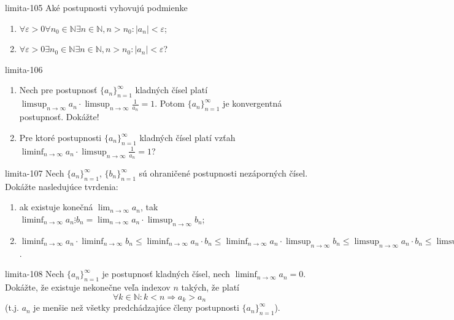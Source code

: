 \begin{defproblem}{limita-105}
Aké postupnosti vyhovujú podmienke
\begin{enumerate}
\item $\forall \varepsilon >0 \forall n_0 \in \mathbb{N} \exists n \in \mathbb{N},n>n_0: |a_n|< \varepsilon$;
\item $\forall \varepsilon >0 \exists n_0 \in \mathbb{N} \exists n \in \mathbb{N},n>n_0: |a_n|< \varepsilon$?
\end{enumerate}
\end{defproblem}

\begin{defproblem}{limita-106}
\begin{enumerate}
\item Nech pre postupnosť ${\{a_n\}}_{n=1}^\infty$ kladných čísel platí $\limsup_{n \rightarrow \infty} a_n \cdot \limsup_{n \rightarrow \infty} \frac{1}{a_n}=1$. Potom ${\{a_n\}}_{n=1}^\infty$ je konvergentná postupnosť. Dokážte!
\item Pre ktoré postupnosti ${\{a_n\}}_{n=1}^\infty$ kladných čísel platí vzťah $\liminf_{n \rightarrow \infty} a_n \cdot \limsup_{n \rightarrow \infty} \frac{1}{a_n}=1$?
\end{enumerate}
\end{defproblem}

\begin{defproblem}{limita-107}
Nech ${\{a_n\}}_{n=1}^\infty$, ${\{b_n\}}_{n=1}^\infty$ sú ohraničené postupnosti nezáporných čísel. Dokážte nasledujúce tvrdenia:
\begin{enumerate}
\item ak existuje konečná $\lim_{n \rightarrow \infty} a_n$, tak $\liminf_{n \rightarrow \infty} a_n \vdots b_n=\lim_{n \rightarrow \infty} a_n \cdot \limsup_{n \rightarrow \infty} b_n$;
\item $\liminf_{n \rightarrow \infty} a_n \cdot \liminf_{n \rightarrow \infty} b_n \leq \liminf_{n \rightarrow \infty} a_n \cdot b_n \leq \liminf_{n \rightarrow \infty} a_n \cdot \limsup_{n \rightarrow \infty} b_n \leq \limsup_{n \rightarrow \infty} a_n \cdot b_n \leq \limsup_{n \rightarrow \infty} a_n \cdot \limsup_{n \rightarrow \infty} b_n$.
\end{enumerate}
\end{defproblem}

\begin{defproblem}{limita-108}
Nech ${\{a_n\}}_{n=1}^\infty$ je postupnosť kladných čísel, nech $\liminf_{n \rightarrow \infty} a_n =0$. Dokážte, že existuje nekonečne veľa indexov $n$ takých, že platí $$\forall k \in \mathbb{N}: k<n \Rightarrow a_k>a_n$$
(t.j. $a_n$ je menšie než všetky predchádzajúce členy postupnosti ${\{a_n\}}_{n=1}^\infty$).
\end{defproblem}